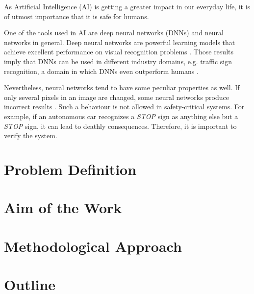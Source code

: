 As Artificial Intelligence (AI) is getting a greater impact in our everyday life, it is of utmost importance that it is safe for humans.  

One of the tools used in AI are deep neural networks (DNNs) and neural networks in general. Deep neural networks are powerful learning models that achieve excellent performance on visual recognition problems \cite{krizhevsky2012imagenet}. Those results imply that DNNs can be used in different industry domains, e.g. traffic sign recognition, a domain in which DNNs even outperform humans \cite{outperformhumans}. 

Nevertheless, neural networks tend to have some peculiar properties as well. If only several pixels in an image are changed, some neural networks produce incorrect results \cite{szegedy2013intriguing}. Such a behaviour is not allowed in safety-critical systems. For example, if an autonomous car recognizes a  \textit{STOP} sign as anything else but a \textit{STOP} sign, it can lead to deathly consequences. Therefore, it is important to verify the system. 

\section{Problem Definition} 
\label{motivation}


\section{Aim of the Work}


\section{Methodological Approach} \label{approach}


\section{Outline} 


